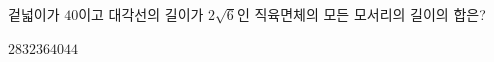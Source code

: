 겉넓이가 $40$이고 대각선의 길이가 $2\sqrt{6}$인 직육면체의 모든 모서리의 길이의 합은?
\begin{choices32}{$28$}{$32$}{$36$}{$40$}{$44$}\end{choices32}
